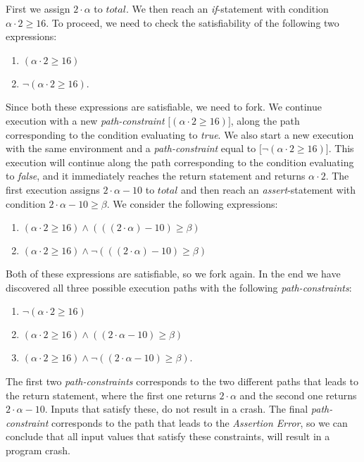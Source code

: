 		First we assign $2\cdot \alpha$ to $total$. We then reach an \textsl{if}-statement with condition $\alpha \cdot 2 \geq 16$. To proceed, we need to check the satisfiability of the following two expressions:
		\begin{enumerate}
			\item $(\alpha \cdot 2 \geq 16)$
			\item $\neg (\alpha \cdot 2 \geq 16)$.
		\end{enumerate}
		Since both these expressions are satisfiable, we need to fork. We continue execution with a new  \emph{path-constraint} $\lbrack (\alpha \cdot 2 \geq 16) \rbrack$, along the path corresponding to the condition evaluating to \emph{true}. We also start a new execution with the same environment and a \emph{path-constraint} equal to $\lbrack \neg (\alpha \cdot 2 \geq 16) \rbrack$. This execution will continue along the path corresponding to the condition evaluating to \emph{false}, and it immediately reaches the return statement and returns $\alpha \cdot 2$.
		The first execution assigns $2\cdot \alpha - 10$ to $total$ and then reach an \textsl{assert}-statement with condition $2\cdot \alpha - 10 \geq \beta$. We consider the following expressions:
		\begin{enumerate}
			\item $(\alpha \cdot 2 \geq 16) \land (((2\cdot \alpha) - 10) \geq \beta)$
			\item $ (\alpha \cdot 2 \geq 16) \land \neg (((2\cdot \alpha) - 10) \geq \beta)$
		\end{enumerate}
		Both of these expressions are satisfiable, so we fork again. In the end we have discovered all three possible execution paths with the following \emph{path-constraints}:
		\begin{enumerate}
			\item $ \neg (\alpha \cdot 2 \geq 16)$
			\item $ (\alpha \cdot 2 \geq 16) \land ((2\cdot \alpha - 10) \geq \beta)$
			\item $ (\alpha \cdot 2 \geq 16) 
			\land \neg ((2\cdot \alpha - 10) \geq \beta)$.
		\end{enumerate}
		
		The first two \emph{path-constraints} corresponds to the two different paths that leads to the return  statement, where the first one returns $2\cdot \alpha$ and the second one returns $2\cdot \alpha - 10$. Inputs that satisfy these, do not result in a crash.
		The final \emph{path-constraint} corresponds to the path that leads to the \textsl{Assertion Error}, so we can conclude that all input values that satisfy these constraints, will result in a program crash.
		
